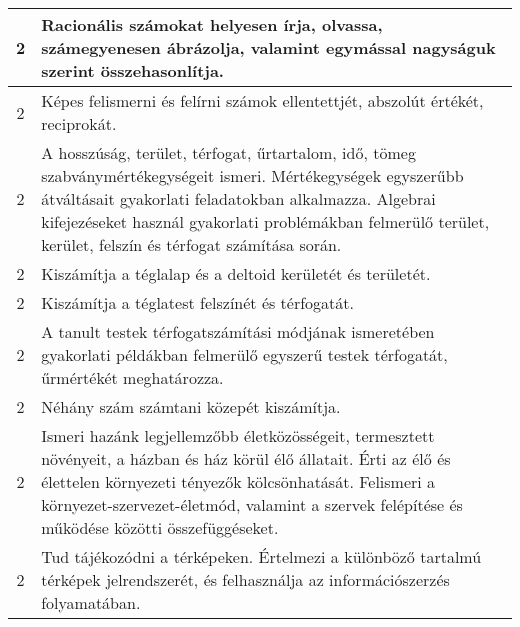 \begin{longtable}{c | p{12cm} }
                                
                                          2 &  Racionális számokat helyesen írja, olvassa, számegyenesen ábrázolja, valamint  egymással nagyságuk szerint összehasonlítja. \\ \hline
                                          2 &  Képes felismerni és felírni számok ellentettjét, abszolút értékét, reciprokát. \\ \hline
                                          2 &  A hosszúság, terület, térfogat, űrtartalom, idő, tömeg szabványmértékegységeit ismeri. Mértékegységek egyszerűbb átváltásait gyakorlati feladatokban alkalmazza. Algebrai kifejezéseket használ gyakorlati problémákban felmerülő  terület, kerület, felszín és térfogat számítása során. \\ \hline
                                          2 &  Kiszámítja a téglalap és a deltoid kerületét és területét.
 \\ \hline
                                          2 &  Kiszámítja a téglatest felszínét és térfogatát. \\ \hline
                                          2 &  A tanult testek térfogatszámítási módjának ismeretében gyakorlati példákban felmerülő egyszerű testek térfogatát, űrmértékét meghatározza. \\ \hline
                                          2 &  Néhány szám számtani közepét kiszámítja. \\ \hline
                                          2 &  Ismeri hazánk legjellemzőbb életközösségeit, termesztett növényeit, a házban és ház körül élő állatait. Érti az élő és élettelen környezeti tényezők kölcsönhatását. Felismeri a környezet-szervezet-életmód, valamint a szervek felépítése és működése közötti összefüggéseket. \\ \hline
                                          2 &  Tud tájékozódni a térképeken. Értelmezi a különböző tartalmú térképek jelrendszerét, és felhasználja az információszerzés folyamatában. \\ \hline
                                      

\end{longtable}
